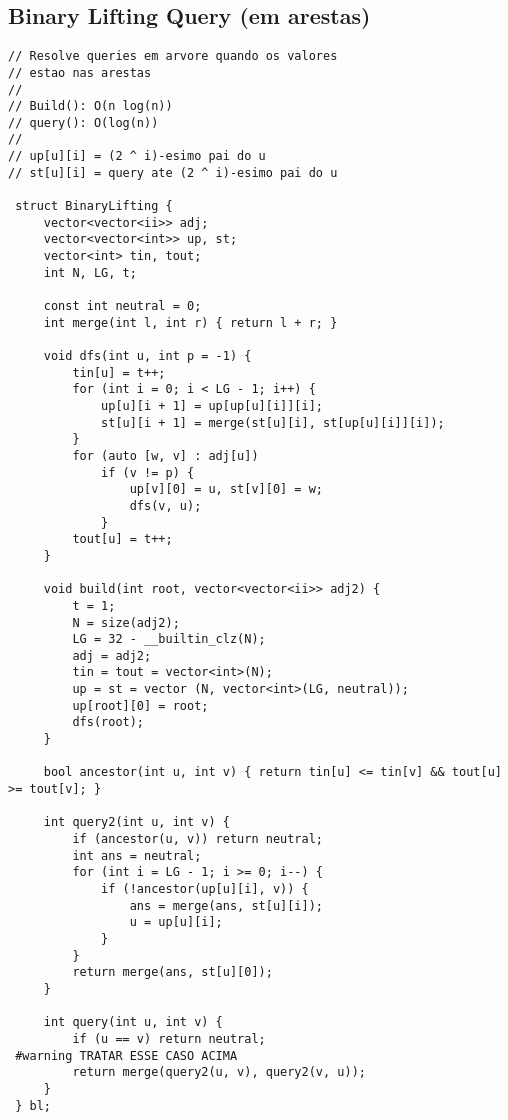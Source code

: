 \documentclass[11pt, a4paper, twoside]{article}
\begin{document}
\subsection{Binary Lifting Query (em arestas)}
\begin{lstlisting}
// Resolve queries em arvore quando os valores
// estao nas arestas
//
// Build(): O(n log(n))
// query(): O(log(n))
//
// up[u][i] = (2 ^ i)-esimo pai do u
// st[u][i] = query ate (2 ^ i)-esimo pai do u

 struct BinaryLifting {
     vector<vector<ii>> adj;
     vector<vector<int>> up, st;
     vector<int> tin, tout;
     int N, LG, t;
 
     const int neutral = 0;
     int merge(int l, int r) { return l + r; }
 
     void dfs(int u, int p = -1) {
         tin[u] = t++;
         for (int i = 0; i < LG - 1; i++) {
             up[u][i + 1] = up[up[u][i]][i];
             st[u][i + 1] = merge(st[u][i], st[up[u][i]][i]);
         }
         for (auto [w, v] : adj[u])
             if (v != p) {
                 up[v][0] = u, st[v][0] = w;
                 dfs(v, u);
             }
         tout[u] = t++;
     }
 
     void build(int root, vector<vector<ii>> adj2) {
         t = 1;
         N = size(adj2);
         LG = 32 - __builtin_clz(N);
         adj = adj2;
         tin = tout = vector<int>(N);
         up = st = vector (N, vector<int>(LG, neutral));
         up[root][0] = root;
         dfs(root);
     }
 
     bool ancestor(int u, int v) { return tin[u] <= tin[v] && tout[u] >= tout[v]; }
 
     int query2(int u, int v) {
         if (ancestor(u, v)) return neutral;
         int ans = neutral;
         for (int i = LG - 1; i >= 0; i--) {
             if (!ancestor(up[u][i], v)) {
                 ans = merge(ans, st[u][i]);
                 u = up[u][i];
             }
         }
         return merge(ans, st[u][0]);
     }
 
     int query(int u, int v) {
         if (u == v) return neutral;
 #warning TRATAR ESSE CASO ACIMA
         return merge(query2(u, v), query2(v, u));
     }
 } bl;
\end{lstlisting}
\end{document}
